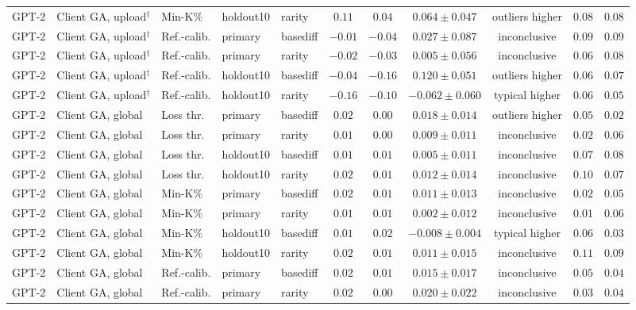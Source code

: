 \begin{table}[t]
\begin{tabular*}{\textwidth}{@{\extracolsep{\fill}}lllllcccccc@{}}
GPT-2 & Client GA, upload$^{\dagger}$ & Min-K\% & holdout10 & rarity & $0.11$ & $0.04$ & $0.064 \pm 0.047$ & outliers higher & $0.08$ & $0.08$ \\
GPT-2 & Client GA, upload$^{\dagger}$ & Ref.-calib. & primary & basediff & $-0.01$ & $-0.04$ & $0.027 \pm 0.087$ & inconclusive & $0.09$ & $0.09$ \\
GPT-2 & Client GA, upload$^{\dagger}$ & Ref.-calib. & primary & rarity & $-0.02$ & $-0.03$ & $0.005 \pm 0.056$ & inconclusive & $0.06$ & $0.08$ \\
GPT-2 & Client GA, upload$^{\dagger}$ & Ref.-calib. & holdout10 & basediff & $-0.04$ & $-0.16$ & $0.120 \pm 0.051$ & outliers higher & $0.06$ & $0.07$ \\
GPT-2 & Client GA, upload$^{\dagger}$ & Ref.-calib. & holdout10 & rarity & $-0.16$ & $-0.10$ & $-0.062 \pm 0.060$ & typical higher & $0.06$ & $0.05$ \\
GPT-2 & Client GA, global & Loss thr. & primary & basediff & $0.02$ & $0.00$ & $0.018 \pm 0.014$ & outliers higher & $0.05$ & $0.02$ \\
GPT-2 & Client GA, global & Loss thr. & primary & rarity & $0.01$ & $0.00$ & $0.009 \pm 0.011$ & inconclusive & $0.02$ & $0.06$ \\
GPT-2 & Client GA, global & Loss thr. & holdout10 & basediff & $0.01$ & $0.01$ & $0.005 \pm 0.011$ & inconclusive & $0.07$ & $0.08$ \\
GPT-2 & Client GA, global & Loss thr. & holdout10 & rarity & $0.02$ & $0.01$ & $0.012 \pm 0.014$ & inconclusive & $0.10$ & $0.07$ \\
GPT-2 & Client GA, global & Min-K\% & primary & basediff & $0.02$ & $0.01$ & $0.011 \pm 0.013$ & inconclusive & $0.02$ & $0.05$ \\
GPT-2 & Client GA, global & Min-K\% & primary & rarity & $0.01$ & $0.01$ & $0.002 \pm 0.012$ & inconclusive & $0.01$ & $0.06$ \\
GPT-2 & Client GA, global & Min-K\% & holdout10 & basediff & $0.01$ & $0.02$ & $-0.008 \pm 0.004$ & typical higher & $0.06$ & $0.03$ \\
GPT-2 & Client GA, global & Min-K\% & holdout10 & rarity & $0.02$ & $0.01$ & $0.011 \pm 0.015$ & inconclusive & $0.11$ & $0.09$ \\
GPT-2 & Client GA, global & Ref.-calib. & primary & basediff & $0.02$ & $0.01$ & $0.015 \pm 0.017$ & inconclusive & $0.05$ & $0.04$ \\
GPT-2 & Client GA, global & Ref.-calib. & primary & rarity & $0.02$ & $0.00$ & $0.020 \pm 0.022$ & inconclusive & $0.03$ & $0.04$ \\

\end{tabular*}
\end{table}
